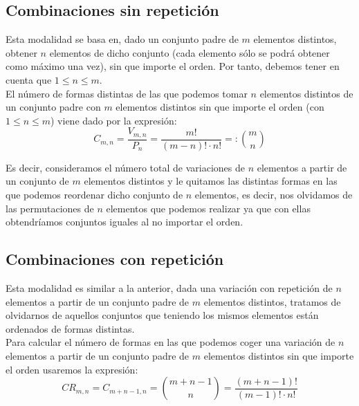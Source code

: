 \subsection{Combinaciones sin repetición}
Esta modalidad se basa en, dado un conjunto padre de $m$ elementos distintos, obtener $n$ elementos
de dicho conjunto (cada elemento sólo se podrá obtener como máximo una vez), sin que importe el orden.
Por tanto, debemos tener en cuenta que $1 \leq n \leq m$.\\


El número de formas distintas de las que podemos tomar $n$ elementos distintos de un conjunto padre con $m$
elementos distintos sin que importe el orden (con $1 \leq n \leq m$) viene dado por la expresión:
$$C_{m, n} = \dfrac{V_{m, n}}{P_n} = \dfrac{m!}{(m-n)! \cdot n!} =: \binom{m}{n} $$


Es decir, consideramos el número total de variaciones de $n$ elementos a partir de un conjunto de $m$ elementos
distintos y le quitamos las distintas formas en las que podemos reordenar dicho conjunto de $n$ elementos,
es decir, nos olvidamos de las permutaciones de $n$ elementos que podemos realizar ya que con ellas
obtendríamos conjuntos iguales al no importar el orden.

\subsection{Combinaciones con repetición}

Esta modalidad es similar a la anterior, dada una variación con repetición de $n$ elementos a partir de un
conjunto padre de $m$ elementos distintos, tratamos de olvidarnos de aquellos conjuntos que teniendo los
mismos elementos están ordenados de formas distintas.\\


Para calcular el número de formas en las que podemos coger una variación de $n$ elementos a partir de un
conjunto padre de $m$ elementos distintos sin que importe el orden usaremos la expresión:
$$CR_{m,n} = C_{m+n-1, n} = \binom{m+n-1}{n} = \dfrac{(m+n-1)!}{(m-1)! \cdot n!}$$